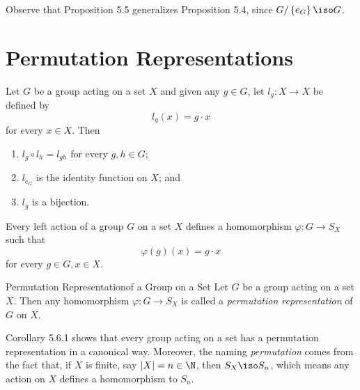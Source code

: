 \documentclass[pmath347]{subfiles}
\begin{document}
    \noindent Observe that Proposition 5.5 generalizes Proposition 5.4, since $G /\left\lbrace e_G \right\rbrace \iso G$.

    \section{Permutation Representations}
    
    \begin{prop}{}
        Let $G$ be a group acting on a set $X$ and given any $g\in G$, let $l_g:X\to X$ be defined by
        \begin{equation*}
            l_g\left( x \right) = g\cdot x
        \end{equation*}
        for every $x\in X$. Then
        \begin{enumerate}
            \item $l_g\circ l_h = l_{gh}$ for every $g,h\in G$;
            \item $l_{e_G}$ is the identity function on $X$; and 
            \item $l_g$ is a bijection.
        \end{enumerate}
    \end{prop}

    \begin{cor}{}
        Every left action of a group $G$ on a set $X$ defines a homomorphism $\varphi:G\to S_X$ such that
        \begin{equation*}
            \varphi\left( g \right) \left( x \right) = g\cdot x
        \end{equation*}
        for every $g\in G, x\in X$.
    \end{cor}	

    \begin{definition}{Permutation Representation}{of a Group on a Set}
        Let $G$ be a group acting on a set $X$. Then any homomorphism $\varphi:G\to S_X$ is called a \emph{permutation representation} of $G$ on $X$.
    \end{definition}

    \np Corollary 5.6.1 shows that every group acting on a set has a permutation representation in a canonical way. Moreover, the naming \textit{permutation} comes from the fact that, if $X$ is finite, say $\left| X \right| = n\in\N$, then $S_X\iso S_n$, which means any action on $X$ defines a homomorphism to $S_n$.
\end{document}
